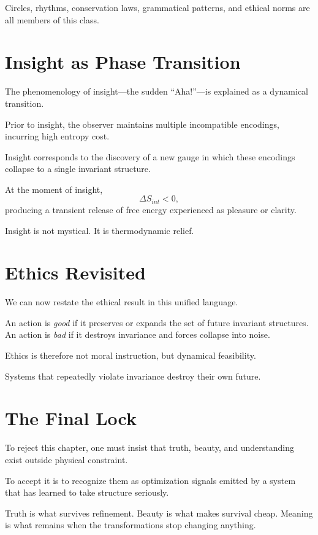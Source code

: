 \documentclass[11pt]{book}
\begin{document}
Circles, rhythms, conservation laws, grammatical patterns, and ethical norms
are all members of this class.

\section{Insight as Phase Transition}

The phenomenology of insight—the sudden “Aha!”—is explained as a dynamical
transition.

Prior to insight, the observer maintains multiple incompatible encodings,
incurring high entropy cost.

Insight corresponds to the discovery of a new gauge in which these encodings
collapse to a single invariant structure.

\begin{proposition}
At the moment of insight,
\[
\Delta S_{int} < 0,
\]
producing a transient release of free energy experienced as pleasure or
clarity.
\end{proposition}

Insight is not mystical.
It is thermodynamic relief.

\section{Ethics Revisited}

We can now restate the ethical result in this unified language.

An action is \emph{good} if it preserves or expands the set of future invariant
structures.
An action is \emph{bad} if it destroys invariance and forces collapse into
noise.

Ethics is therefore not moral instruction, but dynamical feasibility.

Systems that repeatedly violate invariance destroy their own future.

\section{The Final Lock}

To reject this chapter, one must insist that truth, beauty, and understanding
exist outside physical constraint.

To accept it is to recognize them as optimization signals emitted by a system
that has learned to take structure seriously.

Truth is what survives refinement.
Beauty is what makes survival cheap.
Meaning is what remains when the transformations stop changing anything.
\end{document}
